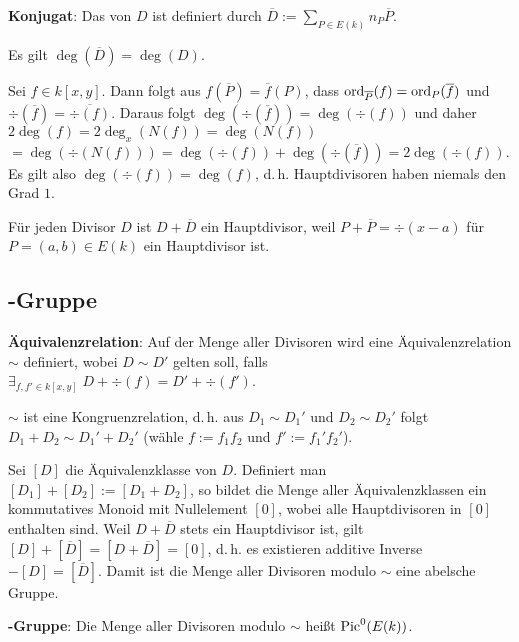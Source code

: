 \linie

\textbf{Konjugat}:
Das  von $D$ ist definiert durch
$\overline{D} := \sum_{P \in E(k)} n_P \overline{P}$.

Es gilt $\deg(\overline{D}) = \deg(D)$.

Sei $f \in k[x, y]$.
Dann folgt aus $f(\overline{P}) = \overline{f}(P)$, dass
$\operatorname{ord}_{\overline{P}}(f) = \operatorname{ord}_P(\overline{f})$ und
$\div(\overline{f}) = \overline{\div(f)}$.
Daraus folgt $\deg(\div(\overline{f})) = \deg(\div(f))$ und daher
$2\deg(f) = 2\deg_x(N(f)) = \deg(N(f))$\\
$= \deg(\div(N(f))) = \deg(\div(f)) + \deg(\div(\overline{f})) = 2\deg(\div(f))$.\\
Es gilt also $\deg(\div(f)) = \deg(f)$, d.\,h. Hauptdivisoren haben niemals den Grad $1$.

Für jeden Divisor $D$ ist $D + \overline{D}$ ein Hauptdivisor,
weil $P + \overline{P} = \div(x - a)$ für $P = (a, b) \in E(k)$ ein Hauptdivisor ist.

\pagebreak

\subsection{%
    -Gruppe%
}

\textbf{Äquivalenzrelation}:
Auf der Menge aller Divisoren wird eine Äquivalenzrelation $\sim$ definiert,
wobei $D \sim D'$ gelten soll, falls $\exists_{f, f' \in k[x, y]}\; D + \div(f) = D' + \div(f')$.

$\sim$ ist eine Kongruenzrelation, d.\,h. aus
$D_1 \sim D_1'$ und $D_2 \sim D_2'$ folgt $D_1 + D_2 \sim D_1' + D_2'$
(wähle $f := f_1 f_2$ und $f' := f_1' f_2'$).

Sei $[D]$ die Äquivalenzklasse von $D$.
Definiert man $[D_1] + [D_2] := [D_1 + D_2]$, so bildet die Menge aller Äquivalenzklassen
ein kommutatives Monoid mit Nullelement $[0]$,
wobei alle Hauptdivisoren in $[0]$ enthalten sind.
Weil $D + \overline{D}$ stets ein Hauptdivisor ist, gilt
$[D] + [\overline{D}] = [D + \overline{D}] = [0]$, d.\,h. es existieren additive Inverse
$-[D] = [\overline{D}]$.
Damit ist die Menge aller Divisoren modulo $\sim$ eine abelsche Gruppe.

\textbf{-Gruppe}:
Die Menge aller Divisoren modulo $\sim$ heißt  $\operatorname{Pic}^0(E(k))$.

\linie

